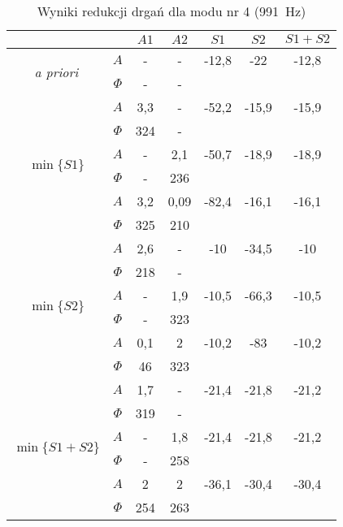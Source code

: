 \documentclass[polish,a4paper,11pt]{mwart}
\begin{document}
  \begin{table}[!tbh]
    \centering
    \caption{Wyniki redukcji drgań dla modu nr 4 (\SI{991}{\hertz})}
    \label{tab:red4}
    \begin{tabular}{|c|c|c|c|c|c|c|}
      \cline{3-7}
      \multicolumn{2}{c|}{}&$A1$&$A2$&$S1$&$S2$&$S1+S2$\\\hline
      \multirow{2}{*}{\textit{a priori}} & $A$ & - & - & -12,8 & -22 & -12,8\\\cline{2-7}
					 & $\Phi$ & - & - & \multicolumn{3}{c}{}\\\hline
      \multirow{6}{*}{$\min\{S1\}$}   &   $A$ & 3,3 & - & -52,2 & -15,9 & -15,9\\\cline{2-7}
				      &$\Phi$ & 324 & - & \multicolumn{3}{c}{}\\\cline{2-7}
				      &   $A$ & - & 2,1 & -50,7 & -18,9 & -18,9\\\cline{2-7}
				      &$\Phi$ & - & 236 & \multicolumn{3}{c}{}\\\cline{2-7}
				      &   $A$ & 3,2 & 0,09 & -82,4 & -16,1 & -16,1\\\cline{2-7}
				      &$\Phi$ & 325 & 210 & \multicolumn{3}{c}{}\\\hline
      \multirow{6}{*}{$\min\{S2\}$}   &   $A$ & 2,6 & - & -10 & -34,5 & -10\\\cline{2-7}
				      &$\Phi$ & 218 & - & \multicolumn{3}{c}{}\\\cline{2-7}
				      &   $A$ & - & 1,9 & -10,5 & -66,3 & -10,5\\\cline{2-7}
				      &$\Phi$ & - & 323 & \multicolumn{3}{c}{}\\\cline{2-7}
				      &   $A$ & 0,1 & 2 & -10,2 & -83 & -10,2\\\cline{2-7}
				      &$\Phi$ & 46 & 323 & \multicolumn{3}{c}{}\\\hline
      \multirow{6}{*}{$\min\{S1+S2\}$}&   $A$ & 1,7 & - & -21,4 & -21,8 & -21,2\\\cline{2-7}
				      &$\Phi$ & 319 & - & \multicolumn{3}{c}{}\\\cline{2-7}
				      &   $A$ & - & 1,8 & -21,4 & -21,8 & -21,2\\\cline{2-7}
				      &$\Phi$ & - & 258 & \multicolumn{3}{c}{}\\\cline{2-7}
				      &   $A$ & 2 & 2 & -36,1 & -30,4 & -30,4\\\cline{2-7}
				      &$\Phi$ & 254 & 263 & \multicolumn{3}{c}{}\\\cline{1-4}
    \end{tabular}
  \end{table}
\end{document}
